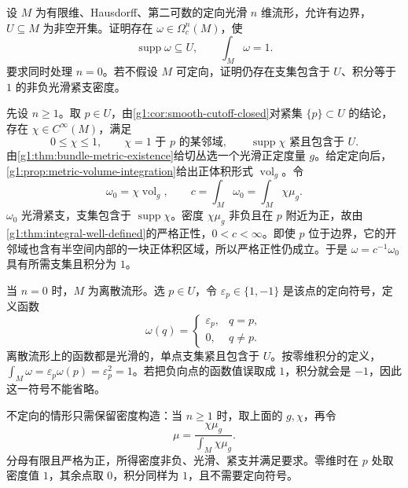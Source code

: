 \begin{exercise}\label{g1:ex:unit-integral-supported-form}
	设 \(M\) 为有限维、Hausdorff、第二可数的定向光滑 \(n\) 维流形，允许有边界，\(U\subseteq M\) 为非空开集。证明存在 \(\omega\in\Omega_c^n(M)\)，使
	\[
		\operatorname{supp}\omega\subseteq U,\qquad \int_M\omega=1.
	\]
	要求同时处理 \(n=0\)。若不假设 \(M\) 可定向，证明仍存在支集包含于 \(U\)、积分等于 \(1\) 的非负光滑紧支密度。
\end{exercise}
\begin{solution}
	先设 \(n\geq1\)。取 \(p\in U\)，由\cref{g1:cor:smooth-cutoff-closed}对紧集 \(\{p\}\subset U\) 的结论，存在 \(\chi\in C^\infty(M)\)，满足
	\[
		0\leq\chi\leq1,\qquad \chi=1\text{ 于 }p\text{ 的某邻域},\qquad
		\operatorname{supp}\chi\text{ 紧且包含于 }U.
	\]
	由\cref{g1:thm:bundle-metric-existence}给切丛选一个光滑正定度量 \(g\)。给定定向后，\cref{g1:prop:metric-volume-integration}给出正体积形式 \(\operatorname{vol}_g\)。令
	\[
		\omega_0=\chi\operatorname{vol}_g,\qquad c=\int_M\omega_0=\int_M\chi\mu_g.
	\]
	\(\omega_0\) 光滑紧支，支集包含于 \(\operatorname{supp}\chi\)。密度 \(\chi\mu_g\) 非负且在 \(p\) 附近为正，故由\cref{g1:thm:integral-well-defined}的严格正性，\(0<c<\infty\)。即使 \(p\) 位于边界，它的开邻域也含有半空间内部的一块正体积区域，所以严格正性仍成立。于是 \(\omega=c^{-1}\omega_0\) 具有所需支集且积分为 \(1\)。

	当 \(n=0\) 时，\(M\) 为离散流形。选 \(p\in U\)，令 \(\varepsilon_p\in\{1,-1\}\) 是该点的定向符号，定义函数
	\[
		\omega(q)=\begin{cases}\varepsilon_p,&q=p,\\0,&q\ne p.\end{cases}
	\]
	离散流形上的函数都是光滑的，单点支集紧且包含于 \(U\)。按零维积分的定义，\(\int_M\omega=\varepsilon_p\omega(p)=\varepsilon_p^2=1\)。若把负向点的函数值误取成 \(1\)，积分就会是 \(-1\)，因此这一符号不能省略。

	不定向的情形只需保留密度构造：当 \(n\geq1\) 时，取上面的 \(g,\chi\)，再令
	\[
		\mu=\frac{\chi\mu_g}{\int_M\chi\mu_g}.
	\]
	分母有限且严格为正，所得密度非负、光滑、紧支并满足要求。零维时在 \(p\) 处取密度值 \(1\)，其余点取 \(0\)，积分同样为 \(1\)，且不需要定向符号。
\end{solution}


